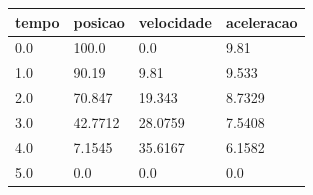 \begin{tabular}{llll}
\toprule
tempo & posicao & velocidade & aceleracao \\
\midrule
0.0 & 100.0 & 0.0 & 9.81 \\
1.0 & 90.19 & 9.81 & 9.533 \\
2.0 & 70.847 & 19.343 & 8.7329 \\
3.0 & 42.7712 & 28.0759 & 7.5408 \\
4.0 & 7.1545 & 35.6167 & 6.1582 \\
5.0 & 0.0 & 0.0 & 0.0 \\
\bottomrule
\end{tabular}
